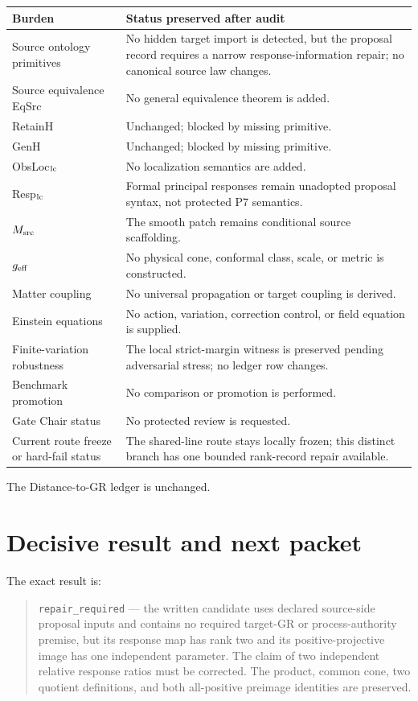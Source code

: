 \documentclass[11pt]{article}
\begin{document}
\begin{longtable}{>{\raggedright\arraybackslash}p{}>{\raggedright\arraybackslash}p{}}
\toprule
Burden & Status preserved after audit \\
\midrule
Source ontology primitives & No hidden target import is detected, but the proposal record requires a narrow response-information repair; no canonical source law changes. \\
Source equivalence EqSrc & No general equivalence theorem is added. \\
RetainH & Unchanged; blocked by missing primitive. \\
GenH & Unchanged; blocked by missing primitive. \\
ObsLoc$_{\rm lc}$ & No localization semantics are added. \\
Resp$_{\rm lc}$ & Formal principal responses remain unadopted proposal syntax, not protected P7 semantics. \\
$M_{\rm src}$ & The smooth patch remains conditional source scaffolding. \\
$g_{\rm eff}$ & No physical cone, conformal class, scale, or metric is constructed. \\
Matter coupling & No universal propagation or target coupling is derived. \\
Einstein equations & No action, variation, correction control, or field equation is supplied. \\
Finite-variation robustness & The local strict-margin witness is preserved pending adversarial stress; no ledger row changes. \\
Benchmark promotion & No comparison or promotion is performed. \\
Gate Chair status & No protected review is requested. \\
Current route freeze or hard-fail status & The shared-line route stays locally frozen; this distinct branch has one bounded rank-record repair available. \\
\bottomrule
\end{longtable}

The Distance-to-GR ledger is unchanged.

\section{Decisive result and next packet}

The exact result is:
\begin{quote}
\texttt{repair\_required} --- the written candidate uses declared source-side
proposal inputs and contains no required target-GR or process-authority premise,
but its response map has rank two and its positive-projective image has one
independent parameter.  The claim of two independent relative response ratios
must be corrected.  The product, common cone, two quotient definitions, and
both all-positive preimage identities are preserved.
\end{quote}
\end{document}
